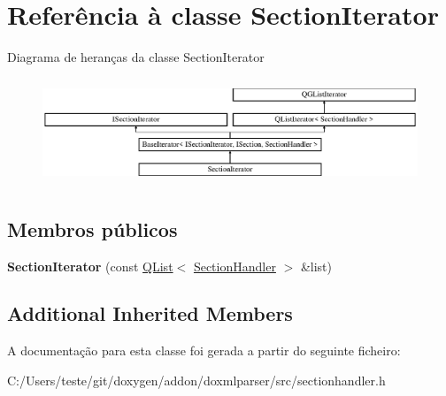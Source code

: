 \hypertarget{class_section_iterator}{\section{Referência à classe Section\-Iterator}
\label{class_section_iterator}
}
Diagrama de heranças da classe Section\-Iterator\begin{figure}[H]
\begin{center}
\leavevmode
\includegraphics[height=3.227666cm]{class_section_iterator}
\end{center}
\end{figure}
\subsection*{Membros públicos}
\begin{DoxyCompactItemize}
\item 
\hypertarget{class_section_iterator_abaa7e5e106b3753d321b3fc5a9683500}{{\bfseries Section\-Iterator} (const \hyperlink{class_q_list}{Q\-List}$<$ \hyperlink{class_section_handler}{Section\-Handler} $>$ \&list)}\label{class_section_iterator_abaa7e5e106b3753d321b3fc5a9683500}

\end{DoxyCompactItemize}
\subsection*{Additional Inherited Members}


A documentação para esta classe foi gerada a partir do seguinte ficheiro\-:\begin{DoxyCompactItemize}
\item 
C\-:/\-Users/teste/git/doxygen/addon/doxmlparser/src/sectionhandler.\-h\end{DoxyCompactItemize}
